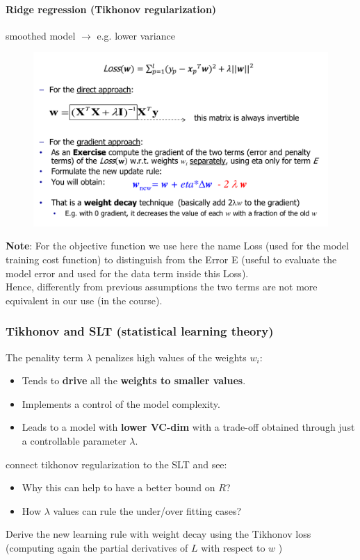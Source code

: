 \documentclass[../main.tex]{subfiles}
\begin{document}
\paragraph{Ridge regression (Tikhonov regularization)}
smoothed model $\rightarrow$ e.g. lower variance
\begin{figure}[H]
    \centering
    \includegraphics[scale = 0.5]{lectures/2_linear_model/tikhonov.png}
\end{figure}
\textbf{Note}: For the objective function we use here the name Loss (used for the model training cost function) to distinguish from the Error E (useful to evaluate the model error and used for the data term inside this Loss).\\
Hence, differently from previous assumptions the two terms are not more equivalent in our use (in the course).

\subsubsection*{Tikhonov and SLT (statistical learning theory)}%
The penality term $\lambda$ penalizes high values of the weights $w_i$:
\begin{itemize}
    \item Tends to \textbf{drive} all the \textbf{weights to smaller values}.
    \item Implements a control of the model complexity.
    \item Leads to a model with \textbf{lower VC-dim} with a trade-off obtained through just a controllable parameter $\lambda$.
\end{itemize}

\begin{exercise}
    connect tikhonov regularization to the SLT and see:
    \begin{itemize}
        \item Why this can help to have a better bound on $R$?
	\item How $\lambda$ values can rule the under/over fitting cases?
    \end{itemize}
\end{exercise}
\begin{exercise}
    Derive the new learning rule with weight decay using the Tikhonov loss (computing again the partial derivatives of $L$  with respect to $w$ )
\end{exercise}
\end{document}
